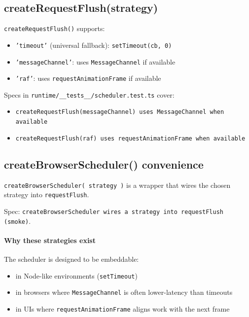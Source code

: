 \subsection{createRequestFlush(strategy)}

\texttt{createRequestFlush()} supports:

\begin{itemize}
  \item \texttt{'timeout'} (universal fallback): \texttt{setTimeout(cb, 0)}
  \item \texttt{'messageChannel'}: uses \texttt{MessageChannel} if available
  \item \texttt{'raf'}: uses \texttt{requestAnimationFrame} if available
\end{itemize}

Specs in \texttt{runtime/\_\_tests\_\_/scheduler.test.ts} cover:

\begin{itemize}
  \item \texttt{createRequestFlush(messageChannel) uses MessageChannel when available}
  \item \texttt{createRequestFlush(raf) uses requestAnimationFrame when available}
\end{itemize}

\subsection{createBrowserScheduler() convenience}

\texttt{createBrowserScheduler({ strategy })} is a wrapper that wires the chosen strategy into \texttt{requestFlush}.

Spec: \texttt{createBrowserScheduler wires a strategy into requestFlush (smoke)}.

\paragraph{Why these strategies exist}

The scheduler is designed to be embeddable:

\begin{itemize}
  \item in Node-like environments (\texttt{setTimeout})
  \item in browsers where \texttt{MessageChannel} is often lower-latency than timeouts
  \item in UIs where \texttt{requestAnimationFrame} aligns work with the next frame
\end{itemize}

